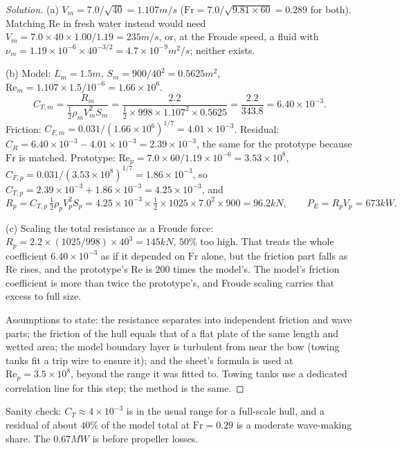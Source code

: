 \begin{proof}[Solution]
(a) $V_m = 7.0/\sqrt{40} = 1.107\unit{m/s}$ ($\mathrm{Fr} = 7.0/\sqrt{9.81 \times 60} = 0.289$ for both). Matching $\mathrm{Re}$ in fresh water instead would need $V_m = 7.0 \times 40 \times 1.00/1.19 = 235\unit{m/s}$, or, at the Froude speed, a fluid with $\nu_m = 1.19\times10^{-6} \times 40^{-3/2} = 4.7\times10^{-9}\unit{m^2/s}$; neither exists.

(b) Model: $L_m = 1.5\unit{m}$, $S_m = 900/40^2 = 0.5625\unit{m^2}$, $\mathrm{Re}_m = 1.107 \times 1.5/10^{-6} = 1.66\times10^6$.
\[
C_{T,m} = \frac{R_m}{\tfrac12\rho_mV_m^2S_m} = \frac{2.2}{\tfrac12 \times 998 \times 1.107^2 \times 0.5625} = \frac{2.2}{343.8} = 6.40\times10^{-3}.
\]
Friction: $C_{F,m} = 0.031/(1.66\times10^6)^{1/7} = 4.01\times10^{-3}$. Residual: $C_R = 6.40\times10^{-3} - 4.01\times10^{-3} = 2.39\times10^{-3}$, the same for the prototype because $\mathrm{Fr}$ is matched.
Prototype: $\mathrm{Re}_p = 7.0 \times 60/1.19\times10^{-6} = 3.53\times10^8$, $C_{F,p} = 0.031/(3.53\times10^8)^{1/7} = 1.86\times10^{-3}$, so $C_{T,p} = 2.39\times10^{-3} + 1.86\times10^{-3} = 4.25\times10^{-3}$, and
\[
R_p = C_{T,p}\,\tfrac12\rho_pV_p^2S_p = 4.25\times10^{-3} \times \tfrac12 \times 1025 \times 7.0^2 \times 900 = 96.2\unit{kN}, \qquad P_E = R_pV_p = 673\unit{kW}.
\]

(c) Scaling the total resistance as a Froude force: $R_p = 2.2 \times (1025/998) \times 40^3 = 145\unit{kN}$, $50\%$ too high. That treats the whole coefficient $6.40\times10^{-3}$ as if it depended on $\mathrm{Fr}$ alone, but the friction part falls as $\mathrm{Re}$ rises, and the prototype's $\mathrm{Re}$ is $200$ times the model's. The model's friction coefficient is more than twice the prototype's, and Froude scaling carries that excess to full size.

Assumptions to state: the resistance separates into independent friction and wave parts; the friction of the hull equals that of a flat plate of the same length and wetted area; the model boundary layer is turbulent from near the bow (towing tanks fit a trip wire to ensure it); and the sheet's formula is used at $\mathrm{Re}_p = 3.5\times10^8$, beyond the range it was fitted to. Towing tanks use a dedicated correlation line for this step; the method is the same.
\end{proof}

Sanity check: $C_T \approx 4\times10^{-3}$ is in the usual range for a full-scale hull, and a residual of about $40\%$ of the model total at $\mathrm{Fr} = 0.29$ is a moderate wave-making share. The $0.67\unit{MW}$ is before propeller losses.

